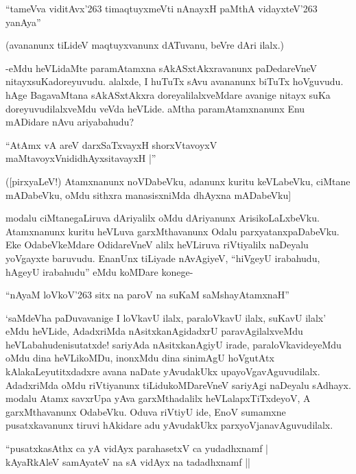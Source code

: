 \begin{shloka}
``tameVva viditAvx\char'263 timaqtuyxmeVti nAnayxH paMthA vidayxteV\char'263 yanAya''
\end{shloka}

(avananunx tiLideV maqtuyxvanunx dATuvanu, beVre dAri ilalx.)

-eMdu heVLidaMte paramAtamxna sAkASxtAkxravanunx paDedareVneV nitayxsuKadoreyuvudu. alalxde, I huTuTx sAvu avananunx biTuTx hoVguvudu. hAge BagavaMtana sAkASxtAkxra doreyalilalxveMdare avanige nitayx suKa doreyuvudilalxveMdu veVda heVLide. aMtha paramAtamxnanunx Enu mADidare nAvu ariyabahudu?

\begin{shloka}
``AtAmx vA areV darxSaTxvayxH shorxVtavoyxV\\
maMtavoyxVnididhAyxsitavayxH |''
\end{shloka}

([pirxyaLeV!) Atamxnanunx noVDabeVku, adanunx kuritu keVLabeVku, ciMtane mADabeVku, oMdu sithxra manasisxniMda dhAyxna mADabeVku]

modalu ciMtanegaLiruva dAriyalilx oMdu dAriyanunx ArisikoLaLxbeVku. Atamxnanunx kuritu heVLuva garxMthavanunx Odalu parxyatanxpaDabeVku. Eke OdabeVkeMdare OdidareVneV alilx heVLiruva riVtiyalilx naDeyalu yoVgayxte baruvudu. EnanUnx tiLiyade nAvAgiyeV, ``hiVgeyU irabahudu, hAgeyU irabahudu'' eMdu koMDare konege-

\begin{shloka}
``nAyaM loVkoV\char'263 sitx na paroV na suKaM saMshayAtamxnaH''
\end{shloka}

`saMdeVha paDuvavanige I loVkavU ilalx, paraloVkavU ilalx, suKavU ilalx' eMdu heVLide, AdadxriMda nAsitxkanAgidadxrU paravAgilalxveMdu heVLabahudenisutatxde! sariyAda nAsitxkanAgiyU irade, paraloVkavideyeMdu oMdu dina heVLikoMDu, inonxMdu dina sinimAgU hoVgutAtx kAlakaLeyutitxdadxre avana naDate yAvudakUkx upayoVgavAguvudilalx. AdadxriMda oMdu riVtiyanunx tiLidukoMDareVneV sariyAgi naDeyalu sAdhayx. modalu Atamx savxrUpa yAva garxMthadalilx heVLalapxTiTxdeyoV, A garxMthavanunx OdabeVku. Oduva riVtiyU ide, EnoV sumamxne pusatxkavanunx tiruvi hAkidare adu yAvudakUkx parxyoVjanavAguvudilalx.

\begin{shloka}
``pusatxkasAthx ca yA vidAyx parahasetxV ca yudadhxnamf |\\
kAyaRkAleV samAyateV na sA vidAyx na tadadhxnamf ||
\end{shloka}

